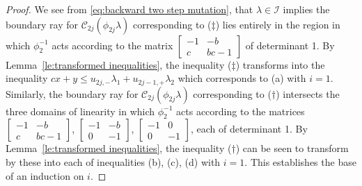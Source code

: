 \documentclass{amsart}
\numberwithin{theorem}{section}
\newcommand{\cC}{\mathcal{C}}
\newcommand{\cI}{\mathcal{I}}
\begin{document}
\begin{proof}
    We see from \eqref{eq:backward two step mutation}, that $\lambda\in\cI$ implies the boundary ray for $\cC_{2j}(\phi_{2j}\lambda)$ corresponding to ($\ddagger$) lies entirely in the region in which $\phi_2^{-1}$ acts according to the matrix $\left[ \begin{array}{cc} -1 & -b\\ c & bc-1 \end{array}\right]$ of determinant 1.
    By Lemma~\ref{le:transformed inequalities}, the inequality ($\ddagger$) transforms into the inequality $cx+y\le u_{2j,-}\lambda_1+u_{2j-1,+}\lambda_2$ which corresponds to (a) with $i=1$.
    Similarly, the boundary ray for $\cC_{2j}(\phi_{2j}\lambda)$ corresponding to ($\dagger$) intersects the three domains of linearity in which $\phi_2^{-1}$ acts according to the matrices $\left[ \begin{array}{cc} -1 & -b\\ c & bc-1 \end{array}\right]$, $\left[ \begin{array}{cc} -1 & -b\\ 0 & -1 \end{array}\right]$, $\left[ \begin{array}{cc} -1 & 0\\ 0 & -1 \end{array}\right]$, each of determinant 1.
    By Lemma~\ref{le:transformed inequalities}, the inequality ($\dagger$) can be seen to transform by these into each of inequalities (b), (c), (d) with $i=1$.
    This establishes the base of an induction on $i$.


\end{proof}
\end{document}
